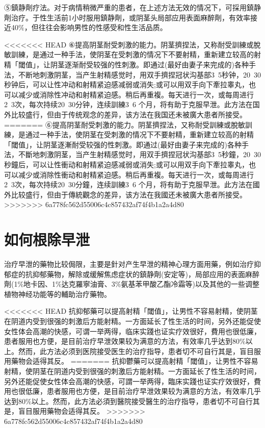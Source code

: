 \documentclass[12pt,UTF8]{ctexbook}
\begin{document}
⑤鎮静劑疗法。对于病情稍微严重的患者，在上述方法无效的情况下，可採用鎮静劑治疗。于性生活前1小时服用鎮静劑，或阴茎头局部应用表面麻醉劑，有效率接近40\%，但往往会影响男性的性感受和性生活品质。

<<<<<<< HEAD
⑥提高阴茎耐受刺激的能力。阴茎擠捏法，又称耐受訓練或脫敏訓練，是通过一种手法，使阴茎在受刺激的情况下不要射精，重新建立较高的射精「閾值」，让阴茎逐渐耐受较强的性刺激。即通过(最好由妻子来完成的)各种手法，不断地刺激阴茎，当产生射精感觉时，用双手擠捏冠状沟基部3~5秒钟，20~30秒钟后，可以让性冲动和射精紧迫感减弱或消失;或可以用双手向下牽拉睾丸，也可以减少或消除性冲动和射精紧迫感。稍后再重複。每天进行一次，或每周进行2~3次，每次持续20~30分钟，连续訓練3~6 个月，将有助于克服早泄。此方法在国外比较盛行，但由于传统观念的差异，该方法在我国还未被廣大患者所接受。
=======
⑥提高阴茎耐受刺激的能力。阴茎擠捏法，又称耐受訓練或脫敏訓練，是通过一种手法，使阴茎在受刺激的情况下不要射精，重新建立较高的射精「閾值」，让阴茎逐漸耐受较强的性刺激。即通过(最好由妻子来完成的)各种手法，不斷地刺激阴茎，当产生射精感觉时，用双手擠捏冠状沟基部3~5秒鐘，20~30秒鐘后，可以让性衝动和射精紧迫感减弱或消失;或可以用双手向下牽拉睾丸，也可以减少或消除性衝动和射精紧迫感。稍后再重複。每天进行一次，或每周进行2~3次，每次持续20~30分鐘，连续訓練3~6 个月，将有助于克服早泄。此方法在國外比较盛行，但由于傳統觀念的差异，该方法在我國还未被廣大患者所接受。
>>>>>>> 6a778fc562d55006c4c857432af74f4b1a2a4d80

\section{如何根除早泄}

治疗早泄的藥物比较侷限，主要是針对产生早泄的精神心理方面用藥，例如治疗抑郁症的抗抑郁藥物，解除或缓解焦虑症状的鎮静劑(安定等)，局部应用的表面麻醉劑(1\%地卡因、1\%达克羅寧油膏、3\%氨基苯甲酸乙酯冷霜等)以及其他的一些调整植物神经功能等的輔助治疗藥物。

<<<<<<< HEAD
抗抑郁藥可以提高射精「閾值」，让男性不容易射精，使阴茎在阴道内受到很强的刺激后方能射精。一方面延长了性生活的时间，另外还能促使女性体会高潮的快感，可谓一举两得，临床实踐也证实疗效很好，費用也很低廉，患者服用也方便，是目前治疗早泄效果较为满意的方法，有效率几乎达到80\%以上。然而，此方法必须到医院接受医生的治疗指导，患者切不可自行其是，盲目服用藥物会适得其反。
=======
抗抑鬱藥可以提高射精「閾值」，让男性不容易射精，使阴茎在阴道内受到很强的刺激后方能射精。一方面延长了性生活的时间，另外还能促使女性体会高潮的快感，可謂一举两得，臨床实踐也证实疗效很好，費用也很低廉，患者服用也方便，是目前治疗早泄效果较为满意的方法，有效率几乎达到80\%以上。然而，此方法必須到醫院接受醫生的治疗指导，患者切不可自行其是，盲目服用藥物会适得其反。
>>>>>>> 6a778fc562d55006c4c857432af74f4b1a2a4d80
\end{document}
